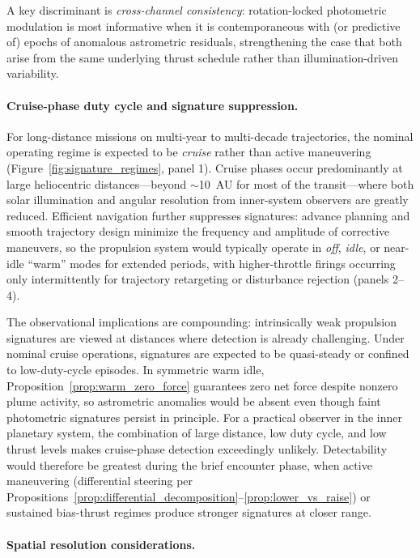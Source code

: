 \documentclass{article}
\begin{document}
A key discriminant is \emph{cross-channel consistency}: rotation-locked photometric modulation is most informative when it is contemporaneous with (or predictive of) epochs of anomalous astrometric residuals, strengthening the case that both arise from the same underlying thrust schedule rather than illumination-driven variability.


\paragraph{Cruise-phase duty cycle and signature suppression.}
For long-distance missions on multi-year to multi-decade trajectories, the nominal operating regime is expected to be \emph{cruise} rather than active maneuvering (Figure~\ref{fig:signature_regimes}, panel 1). Cruise phases occur predominantly at large heliocentric distances---beyond $\sim$10~AU for most of the transit---where both solar illumination and angular resolution from inner-system observers are greatly reduced. Efficient navigation further suppresses signatures: advance planning and smooth trajectory design minimize the frequency and amplitude of corrective maneuvers, so the propulsion system would typically operate in \emph{off}, \emph{idle}, or near-idle ``warm'' modes for extended periods, with higher-throttle firings occurring only intermittently for trajectory retargeting or disturbance rejection (panels 2--4).

The observational implications are compounding: intrinsically weak propulsion signatures are viewed at distances where detection is already challenging. Under nominal cruise operations, signatures are expected to be quasi-steady or confined to low-duty-cycle episodes. In symmetric warm idle, Proposition~\ref{prop:warm_zero_force} guarantees zero net force despite nonzero plume activity, so astrometric anomalies would be absent even though faint photometric signatures persist in principle. For a practical observer in the inner planetary system, the combination of large distance, low duty cycle, and low thrust levels makes cruise-phase detection exceedingly unlikely. Detectability would therefore be greatest during the brief encounter phase, when active maneuvering (differential steering per Propositions~\ref{prop:differential_decomposition}--\ref{prop:lower_vs_raise}) or sustained bias-thrust regimes produce stronger signatures at closer range.

\paragraph{Spatial resolution considerations.}
\end{document}
